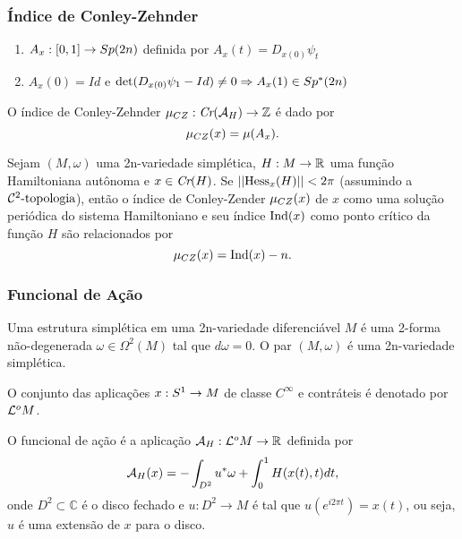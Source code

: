 \documentclass{beamer}
\begin{document}
	\begin{frame}
		
		\frametitle{Índice de Conley-Zehnder}
		\begin{enumerate}
			\item $A_{x}:[0,1] \to Sp(2n)$ definida por $A_{x}(t) = D_{x(0)}\psi_{t}$
			
			\item $A_{x}(0) =Id$ e $\det(D_{x(0)}\psi_{1}-Id) \neq 0 \Rightarrow A_{x}(1)\in Sp^{*}(2n)$ 
		\end{enumerate}
		
		O índice de Conley-Zehnder $\mu_{CZ}:\textit{Cr}(\mathcal{A}_{H}) \to \mathbb{Z}$ é dado por 
			$$
			\mu_{CZ}(x) = \mu(A_{x}).
			$$
		
		
		\begin{corolario}
			Sejam $(M,\omega)$ uma 2n-variedade simplética, $H:M\to \mathbb{R}^{}$ uma função Hamiltoniana autônoma e $x \in \textit{Cr}(H)$. Se $||\text{Hess}_{x}(H)||<2\pi$ (assumindo a $\mathcal{C}^{2}\text{-topologia}$), então o índice de Conley-Zender $\mu_{CZ}(x)$ de $x$ como uma solução periódica do sistema Hamiltoniano e seu índice $\text{Ind}(x)$ como ponto crítico da função $H$ são relacionados por
			$$
			\mu_{CZ}(x) = \text{Ind}(x)-n.
			$$
		\end{corolario}
	\end{frame}
	
	
	\begin{frame}
		\frametitle{Funcional de Ação}
		\begin{definicao}
			
			Uma estrutura simplética em uma 2n-variedade diferenciável $M$ é uma 2-forma não-degenerada $\omega\in \Omega^{2}(M)$ tal que $d\omega=0$. O par $(M, \omega)$ é uma 2n-variedade simplética.
		\end{definicao}
		
		O conjunto das aplicações $x:S^{1} \to M$ de classe $C^{\infty}$ e contráteis é denotado por $\mathcal{L}^{o}M$.
		
		\begin{definicao}
			O funcional de ação é a aplicação $\mathcal{A}_{H}: \mathcal{L}^{o}M\to \mathbb{R}^{}$ definida por
			$$
			\mathcal{A}_{H}(x) = -\int_{D^{2}}u^{*}\omega + \int_{0}^{1}H(x(t), t)dt,
			$$
			onde $D^{2} \subset \mathbb{C}$ é o disco fechado e $u:D^{2}\to M$ é tal que $u(e^{i2\pi t})=x(t)$, ou seja, $u$ é uma extensão de $x$ para o disco.
			
		\end{definicao}
	\end{frame}
	
\end{document}
